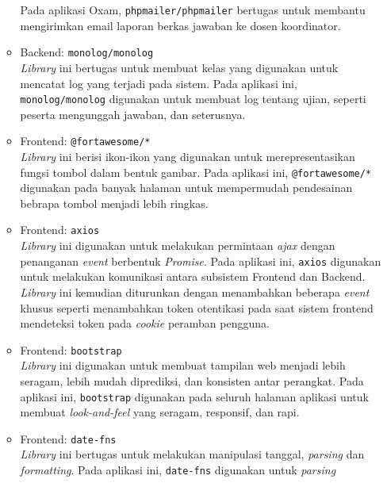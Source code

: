 \begin{itemize}
\begin{itemize}
                    Pada aplikasi Oxam, \texttt{phpmailer/phpmailer} bertugas untuk membantu mengirimkan email
                    laporan berkas jawaban ke dosen koordinator.
                \item Backend: \texttt{monolog/monolog} \\
                    \textit{Library} ini bertugas untuk membuat kelas yang digunakan untuk mencatat log yang
                    terjadi pada sistem. Pada aplikasi ini, \texttt{monolog/monolog} digunakan untuk membuat log
                    tentang ujian, seperti peserta mengunggah jawaban, dan seterusnya.
                \item Frontend: \texttt{@fortawesome/*} \\
                    \textit{Library} ini berisi ikon-ikon yang digunakan untuk merepresentasikan fungsi
                    tombol dalam bentuk gambar. Pada aplikasi ini, \texttt{@fortawesome/*} digunakan pada
                    banyak halaman untuk mempermudah pendesainan bebrapa tombol menjadi lebih ringkas.
                \item Frontend: \texttt{axios} \\
                    \textit{Library} ini digunakan untuk melakukan permintaan \textit{ajax} dengan penanganan 
                    \textit{event} berbentuk \textit{Promise}. Pada aplikasi ini, \texttt{axios} digunakan untuk
                    melakukan komunikasi antara subsistem Frontend dan Backend. \textit{Library} ini kemudian
                    diturunkan dengan menambahkan beberapa \textit{event} khusus seperti menambahkan
                    token otentikasi pada saat sistem frontend mendeteksi token pada \textit{cookie}
                    peramban pengguna.
                \item Frontend: \texttt{bootstrap} \\
                    \textit{Library} ini digunakan untuk membuat tampilan web menjadi lebih seragam, lebih
                    mudah diprediksi, dan konsisten antar perangkat. Pada aplikasi ini, \texttt{bootstrap}
                    digunakan pada seluruh halaman aplikasi untuk membuat \textit{look-and-feel} yang seragam,
                    responsif, dan rapi.
                \item Frontend: \texttt{date-fns} \\
                    \textit{Library} ini bertugas untuk melakukan manipulasi tanggal, \textit{parsing} dan 
                    \textit{formatting}. Pada aplikasi ini, \texttt{date-fns} digunakan untuk \textit{parsing}

\end{itemize}
\end{itemize}
